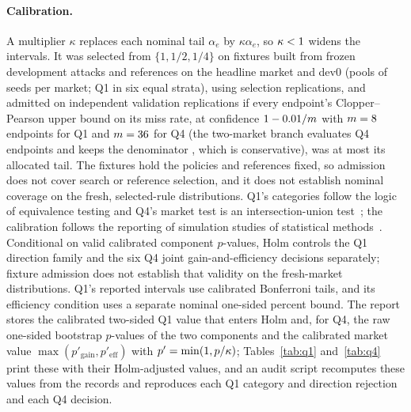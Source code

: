 \documentclass[11pt]{article}
\begin{document}
\paragraph{Calibration.} A multiplier $\kappa$ replaces each nominal tail $\alpha_e$ by $\kappa\alpha_e$, so $\kappa < 1$ widens the intervals. It was selected from $\{1, 1/2, 1/4\}$ on fixtures built from frozen development attacks and references on the headline market and dev0 (pools of  seeds per market; Q1 in six equal strata), using  selection replications, and admitted on  independent validation replications if every endpoint's Clopper--Pearson upper bound on its miss rate, at confidence $1 - 0.01/m$ with $m = 8$ endpoints for Q1 and $m = 36$ for Q4 (the two-market branch evaluates  Q4 endpoints and keeps the denominator , which is conservative), was at most its allocated tail. The fixtures hold the policies and references fixed, so admission does not cover search or reference selection, and it does not establish nominal coverage on the fresh, selected-rule distributions. Q1's categories follow the logic of equivalence testing and Q4's market test is an intersection-union test~\cite{berger1996bioequivalence}; the calibration follows the reporting of simulation studies of statistical methods~\cite{morris2019simulation}. Conditional on valid calibrated component $p$-values, Holm controls the Q1 direction family and the six Q4 joint gain-and-efficiency decisions separately; fixture admission does not establish that validity on the fresh-market distributions. Q1's reported intervals use calibrated Bonferroni tails, and its efficiency condition uses a separate nominal one-sided  percent bound. The report stores the calibrated two-sided Q1 value that enters Holm and, for Q4, the raw one-sided bootstrap $p$-values of the two components and the calibrated market value $\max(p'_{\mathrm{gain}}, p'_{\mathrm{eff}})$ with $p' = \min(1, p/\kappa)$; Tables~\ref{tab:q1} and~\ref{tab:q4} print these with their Holm-adjusted values, and an audit script recomputes these values from the records and reproduces each Q1 category and direction rejection and each Q4 decision.
\end{document}
